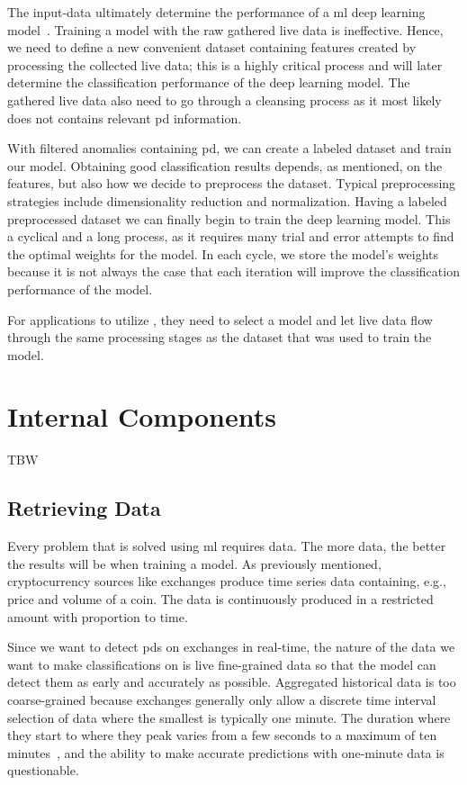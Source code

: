 The input-data ultimately determine the performance of a \ac{ml} deep learning model~\cite{mike_voets}. Training a model with the raw gathered live data is ineffective. Hence, we need to define a new convenient dataset containing features created by processing the collected live data; this is a highly critical process and will later determine the classification performance of the deep learning model. The gathered live data also need to go through a cleansing process as it most likely does not contains relevant \ac{pd} information.

With filtered anomalies containing \ac{pd}, we can create a labeled dataset and train our model. Obtaining good classification results depends, as mentioned, on the features, but also how we decide to preprocess the dataset. Typical preprocessing strategies include dimensionality reduction and normalization. Having a labeled preprocessed dataset we can finally begin to train the deep learning model. This a cyclical and a long process, as it requires many trial and error attempts to find the optimal weights for the model. In each cycle, we store the model's weights because it is not always the case that each iteration will improve the classification performance of the model.

For applications to utilize \project, they need to select a model and let live data flow through the same processing stages as the dataset that was used to train the model.

\section{Internal Components}
TBW

\subsection{Retrieving Data}
Every problem that is solved using \ac{ml} requires data. The more data, the better the results will be when training a model. As previously mentioned, cryptocurrency sources like exchanges produce time series data containing, e.g., price and volume of a coin. The data is continuously produced in a restricted amount with proportion to time.

Since we want to detect \acp{pd} on exchanges in real-time, the nature of the data we want to make classifications on is live fine-grained data so that the model can detect them as early and accurately as possible. Aggregated historical data is too coarse-grained because exchanges generally only allow a discrete time interval selection of data where the smallest is typically one minute. The duration where they start to where they peak varies from a few seconds to a maximum of ten minutes~\cite{P&D_MIT_crypto, P&D_to_the_moon}, and the ability to make accurate predictions with one-minute data is questionable.

